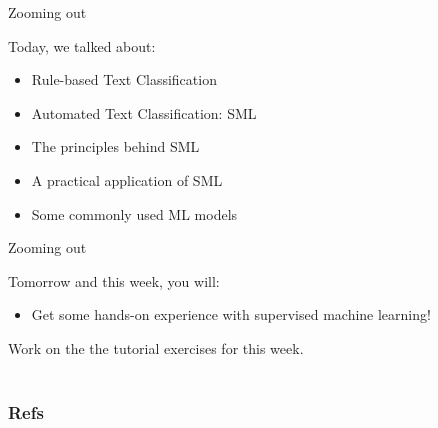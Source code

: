 \documentclass[compress]{beamer}
\begin{document}
\begin{frame}[fragile]{Zooming out} 
	
	\begin{alertblock}{Today, we talked about:}
		\begin{itemize}
			\item Rule-based Text Classification
			\item Automated Text Classification: SML
			\item The principles behind SML
			\item A practical application of SML
			\item Some commonly used ML models
		\end{itemize}
	\end{alertblock}
\end{frame}



\begin{frame}[fragile]{Zooming out} 
	
\begin{alertblock}{Tomorrow and this week, you will:}
	\begin{itemize}
		\item Get some hands-on experience with supervised machine learning!
	\end{itemize}
\end{alertblock}

Work on the the tutorial exercises for this week. \\\
\end{frame}

\begin{frame}
	\frametitle{Refs}
	\printbibliography
\end{frame}
	
\end{document}
